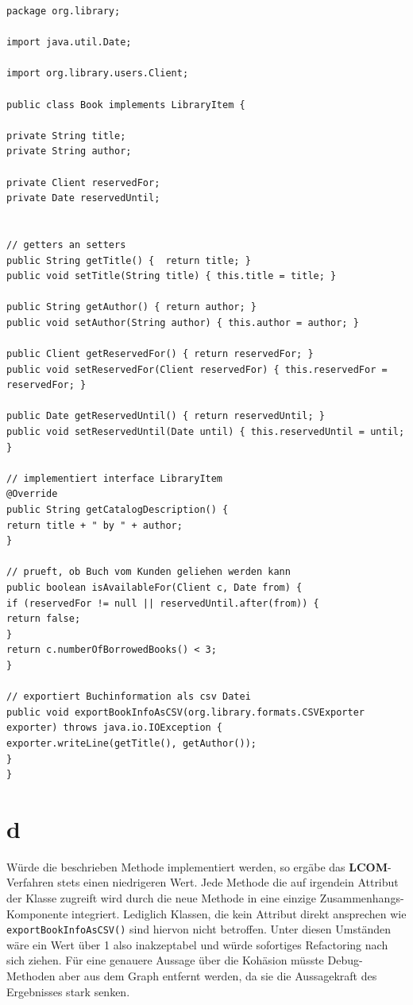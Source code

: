\begin{lstlisting}
package org.library;

import java.util.Date;

import org.library.users.Client;

public class Book implements LibraryItem {

private String title;
private String author;

private Client reservedFor;
private Date reservedUntil;    


// getters an setters
public String getTitle() {  return title; }
public void setTitle(String title) { this.title = title; }

public String getAuthor() { return author; }
public void setAuthor(String author) { this.author = author; }

public Client getReservedFor() { return reservedFor; }
public void setReservedFor(Client reservedFor) { this.reservedFor = reservedFor; }

public Date getReservedUntil() { return reservedUntil; }
public void setReservedUntil(Date until) { this.reservedUntil = until; }

// implementiert interface LibraryItem
@Override
public String getCatalogDescription() {
return title + " by " + author;  
}

// prueft, ob Buch vom Kunden geliehen werden kann
public boolean isAvailableFor(Client c, Date from) {
if (reservedFor != null || reservedUntil.after(from)) {
return false;
}
return c.numberOfBorrowedBooks() < 3;
}

// exportiert Buchinformation als csv Datei
public void exportBookInfoAsCSV(org.library.formats.CSVExporter exporter) throws java.io.IOException {        
exporter.writeLine(getTitle(), getAuthor());        
}    
}
\end{lstlisting}
\section*{d} 
Würde die beschrieben Methode implementiert werden, so ergäbe das \textbf{LCOM}-Verfahren stets einen niedrigeren Wert. Jede Methode die auf irgendein Attribut der Klasse zugreift wird durch die neue Methode in eine einzige Zusammenhangs-Komponente integriert.
Lediglich Klassen, die kein Attribut direkt ansprechen wie \texttt{exportBookInfoAsCSV()} sind hiervon nicht betroffen.
Unter diesen Umständen wäre ein Wert über 1 also inakzeptabel und würde sofortiges Refactoring nach sich ziehen. Für eine genauere Aussage über die Kohäsion müsste Debug-Methoden aber aus dem Graph entfernt werden, da sie die Aussagekraft des Ergebnisses stark senken. 

